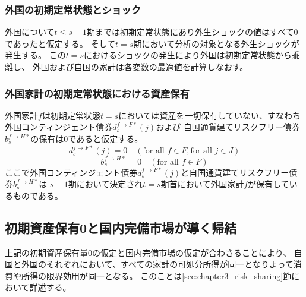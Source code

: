 \subsubsection{外国の初期定常状態とショック}
\label{sec:chapter3_assumptions_steady_state_foreign_shocks}
外国について\(t\le s-1\)期までは初期定常状態にあり外生ショックの値はすべて0であったと仮定する。
そして\(t=s\)期において分析の対象となる外生ショックが発生する。
この\(t=s\)におけるショックの発生により外国は初期定常状態から乖離し、
外国および自国の家計は各変数の最適値を計算しなおす。

\subsubsection{外国家計の初期定常状態における資産保有}
\label{sec:chapter3_assumptions_steady_state_foreign_asset_holdings}
外国家計\(f\)は初期定常状態\(t=s\)においては資産を一切保有していない、すなわち
外国コンティンジェント債券\(d_s^{f\to F*}(j)\)および
自国通貨建てリスクフリー債券\(b_s^{f\to H*}\)の保有は0であると仮定する。
\begin{equation}
\label{form:chapter3_assumptions_steady_state_foreign_asset_holdings_d_s_f_star_eq}
    d_s^{f\to F*}(j)=0\quad(\text{for all }f\in F, \text{for all }j\in J)
\end{equation}
\begin{equation}
\label{form:chapter3_assumptions_steady_state_foreign_asset_holdings_b_s_f_star_eq}
    b_s^{f\to H*}=0\quad(\text{for all }f\in F)
\end{equation}
ここで外国コンティンジェント債券\(d_s^{f\to F*}(j)\)と自国通貨建てリスクフリー債券\(b_s^{f\to H*}\)は
\(s-1\)期において決定され\(t=s\)期首において外国家計\(f\)が保有しているものである。

\subsection{初期資産保有0と国内完備市場が導く帰結}
\label{sec:chapter3_assumptions_steady_state_zero_asset_holdings_and_complete_market}
上記の初期資産保有量0の仮定と国内完備市場の仮定が合わさることにより、
自国と外国のそれぞれにおいて、すべての家計の可処分所得が同一となりよって消費や所得の限界効用が同一となる。
このことは\ref{sec:chapter3_risk_sharing}節において詳述する。